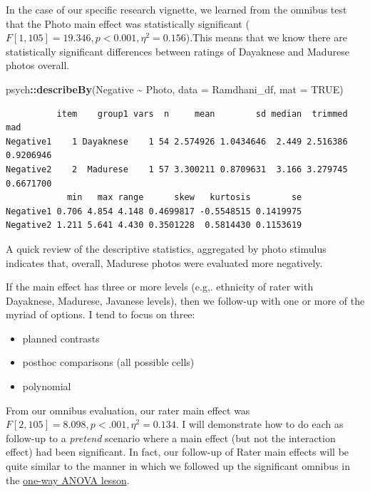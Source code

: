 \documentclass[
  11pt,
]{book}
\newenvironment{Shaded}{\begin{snugshade}}{\end{snugshade}}
\newcommand{\AttributeTok}[1]{\textcolor[rgb]{0.27,0.27,0.27}{#1}}
\newcommand{\ConstantTok}[1]{\textcolor[rgb]{0.37,0.37,0.37}{#1}}
\newcommand{\FunctionTok}[1]{\textcolor[rgb]{0.27,0.27,0.27}{\textbf{#1}}}
\newcommand{\NormalTok}[1]{#1}
\newcommand{\SpecialCharTok}[1]{\textcolor[rgb]{0.43,0.43,0.43}{\textbf{#1}}}
\providecommand{\tightlist}{%
  \setlength{\itemsep}{0pt}\setlength{\parskip}{0pt}}
\begin{document}
In the case of our specific research vignette, we learned from the omnibus test that the Photo main effect was statistically significant (\(F[1, 105] = 19.346, p < 0.001, \eta ^{2} = 0.156\)).This means that we know there are statistically significant differences between ratings of Dayaknese and Madurese photos overall.

\begin{Shaded}
\begin{Highlighting}[]
\NormalTok{psych}\SpecialCharTok{::}\FunctionTok{describeBy}\NormalTok{(Negative }\SpecialCharTok{\textasciitilde{}}\NormalTok{ Photo, }\AttributeTok{data =}\NormalTok{ Ramdhani\_df, }\AttributeTok{mat =} \ConstantTok{TRUE}\NormalTok{)}
\end{Highlighting}
\end{Shaded}

\begin{verbatim}
          item    group1 vars  n     mean        sd median  trimmed       mad
Negative1    1 Dayaknese    1 54 2.574926 1.0434646  2.449 2.516386 0.9206946
Negative2    2  Madurese    1 57 3.300211 0.8709631  3.166 3.279745 0.6671700
            min   max range      skew   kurtosis        se
Negative1 0.706 4.854 4.148 0.4699817 -0.5548515 0.1419975
Negative2 1.211 5.641 4.430 0.3501228  0.5814430 0.1153619
\end{verbatim}

A quick review of the descriptive statistics, aggregated by photo stimulus indicates that, overall, Madurese photos were evaluated more negatively.

If the main effect has three or more levels (e.g,. ethnicity of rater with Dayaknese, Madurese, Javanese levels), then we follow-up with one or more of the myriad of options. I tend to focus on three:

\begin{itemize}
\tightlist
\item
  planned contrasts
\item
  posthoc comparisons (all possible cells)
\item
  polynomial
\end{itemize}

From our omnibus evaluation, our rater main effect was \(F[2, 105] = 8.098, p < .001, \eta ^{2} = 0.134\). I will demonstrate how to do each as follow-up to a \emph{pretend} scenario where a main effect (but not the interaction effect) had been significant. In fact, our follow-up of Rater main effects will be quite similar to the manner in which we followed up the significant omnibus in the \protect\hyperlink{oneway}{one-way ANOVA lesson}.
\end{document}
